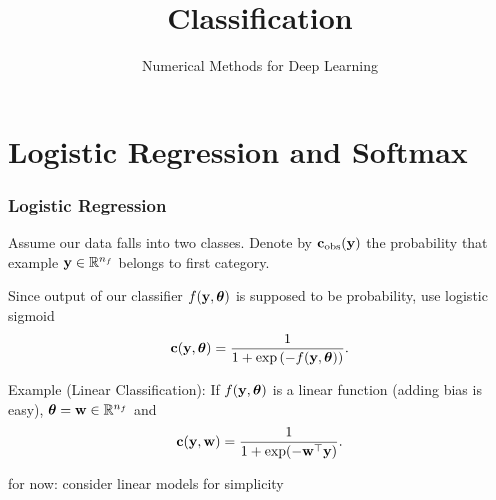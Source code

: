 \documentclass[12pt,fleqn,handout]{beamer}
\title{Classification}
\subtitle{Numerical Methods for Deep Learning}
\date{}
\begin{document}
\makebeamertitle

\section{Logistic Regression and Softmax} %
\label{sec:logistic_regression_and_softmax}

\begin{frame}
	\frametitle{Logistic Regression}
	
	
	Assume our data falls into two classes. Denote by ${\bf c}_{\rm obs}({\bf y})$ the probability that example ${\bf y}\in\mathbb{R}^{n_f}$ belongs to first category.
	
	\bigskip
	
	Since output of our classifier $f({\bf y},{\boldsymbol \theta})$ is supposed to be probability, use logistic sigmoid
	$$
		{\bf c}({\bf y},{\boldsymbol \theta}) = \frac{1}{1 + \exp\left(-f({\bf y},{\boldsymbol \theta})\right)}.
	$$
	
	\bigskip
	
	Example (Linear Classification): If $f({\bf y},{\boldsymbol \theta})$ is a linear function (adding bias is easy), ${\boldsymbol \theta} = {\bf w} \in \mathbb{R}^{n_f}$ and
	$$
		{\bf c}({\bf y},{\bf w}) = \frac{1}{1 + \exp(-{\bf w}^\top{\bf y})}.
	$$
	
	\begin{center}
		for now: consider linear models for simplicity
	\end{center}
	
\end{frame}
\end{document}
